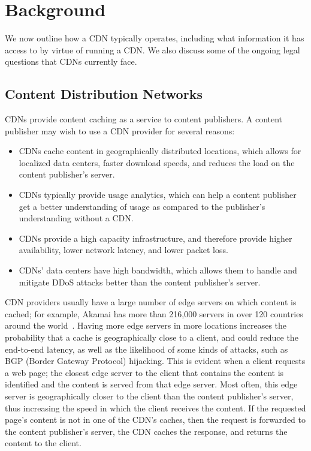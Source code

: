 \section{Background}
\label{sec:background}

We now outline how a CDN typically operates, including what information it
has access to by virtue of running a CDN. We also discuss some of the ongoing legal
questions that CDNs currently face.

\subsection{Content Distribution Networks}
CDNs provide content caching as a service to content publishers.  A 
content publisher may wish to use a CDN provider for several reasons:

\begin{itemize}
\item CDNs cache content in geographically distributed locations, which allows for localized 
data centers, faster download speeds, and reduces the load on the content publisher's server.
\item CDNs typically provide usage analytics, which can help a content publisher get a better 
understanding of usage as compared to the publisher's understanding without a CDN.
\item CDNs provide a high capacity infrastructure, and therefore provide higher availability, 
lower network latency, and lower packet loss.  
\item CDNs' data centers have high bandwidth, which allows them to handle and mitigate DDoS attacks better 
than the content publisher's server.
\end{itemize}

CDN providers usually have a large number of edge servers on which content is cached; for example, 
Akamai has more than 216,000 servers in over 120 countries around the world~\cite{akamai_facts}.  
Having more edge servers in more locations increases the probability that a cache is geographically 
close to a client, and could reduce the end-to-end latency, as well as the likelihood of some kinds of 
attacks, such as BGP (Border Gateway Protocol) hijacking.  This is evident when a client requests a web page; the closest 
edge server to the client that contains the content is identified and the content is served from that 
edge server.  Most often, this edge server is geographically closer to the client than the content publisher's 
server, thus increasing the speed in which the client receives the content. If the requested page's content is 
not in one of the CDN's caches, then the request is forwarded to the content publisher's server, the CDN 
caches the response, and returns the content to the client. 

